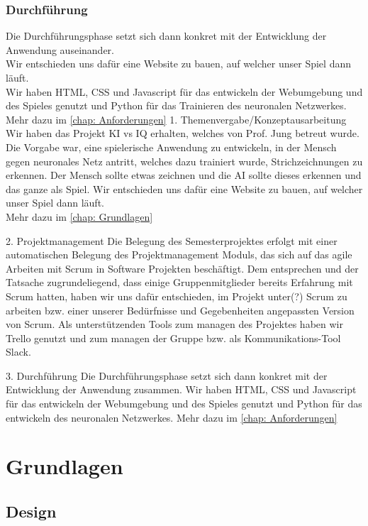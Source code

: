 \documentclass[11pt]{article}
\begin{document}
\subsubsection{ Durchführung }
Die Durchführungsphase setzt sich dann konkret mit der 					Entwicklung der Anwendung auseinander.\\
Wir entschieden uns dafür eine Website zu bauen, auf welcher 			unser Spiel dann läuft.\\
Wir haben HTML, CSS und Javascript für das entwickeln der 			Webumgebung und des Spieles genutzt und Python für das 				Trainieren des neuronalen Netzwerkes.\\
Mehr dazu im \autoref{chap: Anforderungen}
1. Themenvergabe/Konzeptausarbeitung
	Wir haben das Projekt KI vs IQ erhalten, welches von Prof. Jung 		betreut wurde.
	Die Vorgabe war, eine spielerische Anwendung zu entwickeln, 			in der Mensch gegen neuronales Netz antritt, welches dazu 				trainiert wurde, Strichzeichnungen zu erkennen.
	Der Mensch sollte etwas zeichnen und die AI sollte dieses 				erkennen und das ganze als Spiel.
	Wir entschieden uns dafür eine Website zu bauen, auf welcher 			unser Spiel dann läuft. \\
	Mehr dazu im \autoref{chap: Grundlagen}

2. Projektmanagement
	Die Belegung des Semesterprojektes erfolgt mit einer 						automatischen Belegung des Projektmanagement Moduls, 				das sich auf das agile Arbeiten mit Scrum in Software 				Projekten beschäftigt. Dem entsprechen und der Tatsache 				zugrundeliegend, dass einige Gruppenmitglieder bereits 					Erfahrung mit Scrum hatten, haben wir uns dafür entschieden, im 	Projekt unter(?) Scrum zu arbeiten bzw. einer unserer 						Bedürfnisse und Gegebenheiten angepassten Version von 				Scrum.
	Als unterstützenden Tools zum managen des Projektes haben wir 	Trello genutzt und zum managen der Gruppe bzw. als 						Kommunikations-Tool Slack.
	

3. Durchführung
	Die Durchführungsphase setzt sich dann konkret mit der 					Entwicklung der Anwendung zusammen.
	Wir haben HTML, CSS und Javascript für das entwickeln der 			Webumgebung und des Spieles genutzt und Python für das 				entwickeln des neuronalen Netzwerkes.
	Mehr dazu im \autoref{chap: Anforderungen}

\section{Grundlagen}
\label{chap: Grundlagen}
\subsection{Design}
\end{document}
